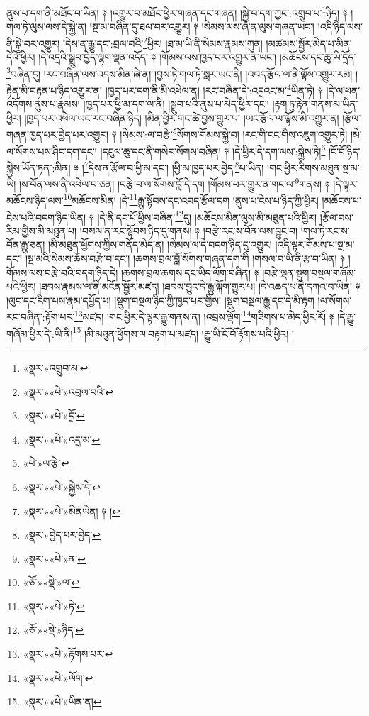 ནུས་པ་དག་ནི་མཐོང་བ་ཡིན། ༈ །འགྱུར་བ་མཐོང་ཕྱིར་གཞན་དང་གཞན། །སྐྱེ་བ་དག་ཀྱང་:འགྲུབ་པ་\footnote{«སྣར་»འགྲུབ་མ་}ཉིད། ༈ །གལ་ཏེ་ལུས་ལས་དེ་སྐྱེ་ན། །སྔ་མ་བཞིན་དུ་ཐལ་བར་འགྱུར། ༈ །སེམས་ལས་ཞེ་ན་ལུས་གཞན་ཡང་། །འདི་ཉིད་ལས་ནི་སྐྱེ་བར་འགྱུར། །དེས་ན་རྒྱུ་དང་:བྲལ་བའི་\footnote{«སྣར་»«པེ་»འབྲལ་བའི་}ཕྱིར། །ཐ་མ་ཡི་ནི་སེམས་རྣམས་ཀུན། །མཚམས་སྦྱོར་མེད་པ་མིན་དེའི་ཕྱིར། །དེ་འདྲའི་སྒྲུབ་བྱེད་ལྷག་ལྡན་འདོད། ༈ །གོམས་ལས་ཁྱད་པར་འགྱུར་ན་ཡང་། །མཆོངས་དང་ཆུ་ཡི་དྲོད་\footnote{«སྣར་»«པེ་»དྲོ་}བཞིན་དུ། །རང་བཞིན་ལས་འདས་མིན་ཞེ་ན། །བྱས་ཏེ་གལ་ཏེ་སླར་ཡང་ནི། །འབད་རྩོལ་ལ་ནི་ལྟོས་འགྱུར་རམ། །རྟེན་མི་བརྟན་པ་ཉིད་འགྱུར་ན། །ཁྱད་པར་དག་ནི་མི་འཕེལ་ན། །རང་བཞིན་དེ་:འདྲའང་མ་\footnote{«སྣར་»«པེ་»འདྲ་མ་}ཡིན་ཏེ། ༈ །དེ་ལ་ཕན་འདོགས་ནུས་པ་རྣམས། །ཁྱད་པར་ཕྱི་མ་དག་ལ་ནི། །སྒྲུབ་པའི་ནུས་པ་མེད་ཕྱིར་དང་། །རྟག་ཏུ་རྟེན་གནས་མ་ཡིན་ཕྱིར། །ཁྱད་པར་འཕེལ་ཡང་རང་བཞིན་ཉིད། །མིན་ཕྱིར་གང་ཚེ་བྱས་གྱུར་པ། །ཡང་རྩོལ་ལ་ལྟོས་མི་འགྱུར་ན། །རྩོལ་གཞན་ཁྱད་པར་བྱེད་པར་འགྱུར། ༈ །སེམས་:ལ་བརྩེ་\footnote{«པེ་»ལ་རྩེ་}སོགས་གོམས་སྐྱེ་བ། །རང་གི་ངང་གིས་འཇུག་འགྱུར་ཏེ། །མེ་ལ་སོགས་པས་ཤིང་དག་དང་། །དངུལ་ཆུ་དང་ནི་གསེར་སོགས་བཞིན། ༈ །དེ་ཕྱིར་དེ་དག་ལས་:སྐྱེས་ཏེ།\footnote{«སྣར་»«པེ་»སྐྱེས་དེ།} །ངོ་བོ་ཉིད་སྐྱེས་ཡོན་ཏན་:མིན། ༈ །\footnote{«སྣར་»«པེ་»མིནཡིན། ༈ །}དེས་ན་རྩོལ་བ་ཕྱི་མ་དང་། །ཕྱི་མ་ཁྱད་པར་བྱེད་\footnote{«སྣར་»བྱེད་པར་བྱེད་}པ་ཡིན། །གང་ཕྱིར་རིགས་མཐུན་སྔ་མ་ཡི། །ས་བོན་ལས་ནི་འཕེལ་བ་ཅན། །བརྩེ་བ་ལ་སོགས་བློ་དེ་དག །གོམས་པར་གྱུར་ན་གང་ལ་\footnote{«སྣར་»«པེ་»ན་}གནས། ༈ །དེ་ལྟར་མཆོངས་ཉིད་ལས་\footnote{«ཅོ་»«སྡེ་»ལ་}མཆོངས་མིན། །དེ་\footnote{«སྣར་»«པེ་»ཏེ་}རྒྱུ་སྟོབས་དང་འབད་རྩོལ་དག །ནུས་པ་ངེས་པ་ཉིད་ཀྱི་ཕྱིར། །མཆོངས་པ་ངེས་པའི་བདག་ཉིད་ཡིན། ༈ །དེ་ནི་དང་པོ་ཕྱིས་བཞིན་\footnote{«ཅོ་»«སྡེ་»ཉིད་}དུ། །མཆོངས་མིན་ལུས་མི་མཐུན་པའི་ཕྱིར། །རྩོལ་བས་རིམ་གྱིས་མི་མཐུན་པ། །བསལ་ན་རང་སྟོབས་ཉིད་དུ་གནས། ༈ །བརྩེ་རང་ས་བོན་ལས་བྱུང་བ། །གལ་ཏེ་རང་ས་བོན་རྒྱུ་ཅན། །མི་མཐུན་ཕྱོགས་ཀྱིས་གནོད་མེད་ན། །སེམས་ལ་དེ་བདག་ཉིད་དུ་འགྱུར། །འདི་ལྟར་གོམས་པ་སྔ་མ་དང་། །སྔ་མའི་སེམས་ཆོས་བརྩེ་བ་དང་། །ཆགས་བྲལ་བློ་སོགས་གཞན་དག་གི །གསལ་བ་ཡི་ནི་རྩ་བ་ཡིན། ༈ །གོམས་ལས་བརྩེ་བའི་བདག་ཉིད་དེ། །ཆགས་བྲལ་ཆགས་དང་ཡིད་ལོག་བཞིན། ༈ །བརྩེ་ལྡན་སྡུག་བསྔལ་གཞོམ་པའི་ཕྱིར། །ཐབས་རྣམས་ལ་ནི་མངོན་སྦྱོར་མཛད། །ཐབས་བྱུང་དེ་རྒྱུ་ལྐོག་གྱུར་པ། །དེ་འཆད་པ་ནི་དཀའ་བ་ཡིན། ༈ །ལུང་དང་རིག་པས་རྣམ་དཔྱོད་པ། །སྡུག་བསྔལ་ཉིད་ཀྱི་ཁྱད་པར་གྱིས། །སྡུག་བསྔལ་རྒྱུ་དང་དེ་མི་རྟག །ལ་སོགས་རང་བཞིན་:རྟོག་པར་\footnote{«སྣར་»«པེ་»རྟོགས་པར་}མཛད། །གང་ཕྱིར་དེ་ལྟར་རྒྱུ་གནས་ན། །འབྲས་ལྡོག་\footnote{«སྣར་»«པེ་»ལོག་}གཟིགས་པ་མེད་ཕྱིར་རོ། ༈ །དེ་རྒྱུ་གཞོམ་ཕྱིར་དེ་:ཡི་ནི།\footnote{«སྣར་»«པེ་»ཡིན་ན།} །མི་མཐུན་ཕྱོགས་ལ་བརྟག་པ་མཛད། །རྒྱུ་ཡི་ངོ་བོ་རྟོགས་པའི་ཕྱིར། །
